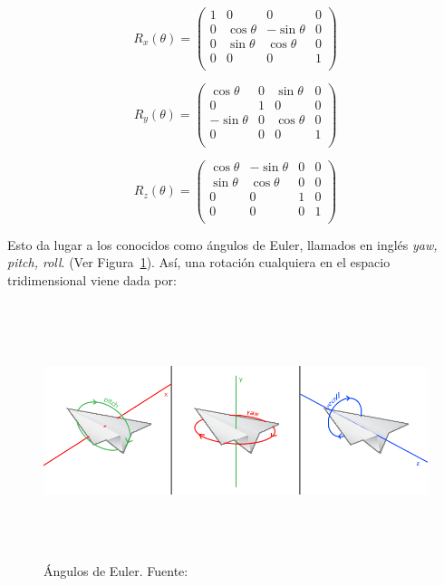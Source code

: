\begin{equation}
	R_x(\theta) =
	\left(	
		\begin{array}{cccc}
			1 & 0 & 0 & 0 \\				
			0 & \cos{\theta} & -\sin{\theta} & 0 \\				
			0 & \sin{\theta} & \cos{\theta} & 0 \\				
			0 & 0 & 0 & 1 \\				
		\end{array}
	\right)
\end{equation}

\begin{equation}
	R_y(\theta) =
	\left(	
		\begin{array}{cccc}
			\cos{\theta} & 0 & \sin{\theta} & 0 \\				
			0 & 1 & 0 & 0 \\				
			-\sin{\theta} & 0 & \cos{\theta} & 0 \\				
			0 & 0 & 0 & 1 \\				
		\end{array}
	\right)
\end{equation}

\begin{equation}
	R_z(\theta) =
	\left(	
		\begin{array}{cccc}
			\cos{\theta} & -\sin{\theta} & 0 & 0 \\				
			\sin{\theta} & \cos{\theta} & 0 & 0 \\				
			0 & 0 & 1 & 0\\				
			0 & 0 & 0 & 1 \\				
		\end{array}
	\right)
\end{equation} 

Esto da lugar a los conocidos como ángulos de Euler, llamados en inglés
\textit{yaw, pitch, roll}. (Ver Figura~\ref{fig:eulerangles}). Así, una rotación
cualquiera en el espacio tridimensional viene dada por:

\begin{figure}
	\centering
	\includegraphics[height=7.5cm,width=\textwidth]{figures/eulerangles.png}
	\caption[Ángulos de Euler.]{Ángulos de Euler. Fuente:~\citet{LearnOpenGL}}
	\label{fig:eulerangles}
\end{figure}

